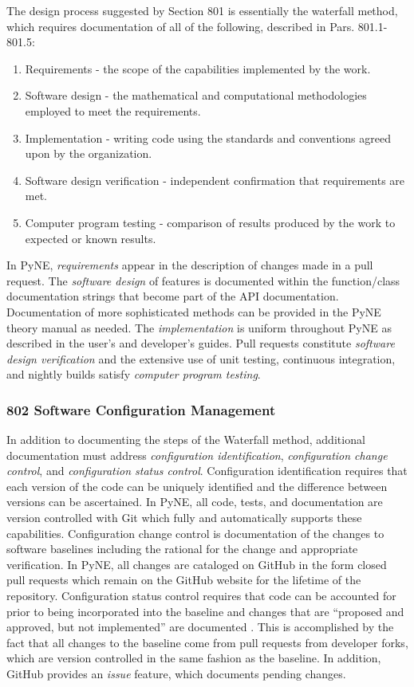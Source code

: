 \documentclass{anstrans}
\begin{document}
The design process suggested by Section 801 is essentially the waterfall method, which requires documentation of all of the following, described in Pars. 801.1-801.5:

\begin{enumerate} 
\item{Requirements - the scope of the capabilities implemented by the work.}
\item{Software design - the mathematical and computational methodologies employed to meet the requirements.}
\item{Implementation - writing code using the standards and conventions agreed upon by the organization.}
\item{Software design verification - independent confirmation that requirements are met.}
\item{Computer program testing - comparison of results produced by the work to expected or known results.}
\end{enumerate}

In PyNE, \emph{requirements} appear in the description of changes made in
a pull request. 
The \emph{software design} of features is documented
within the function/class documentation strings that become part of the API
documentation. Documentation of more sophisticated methods can be provided in the PyNE
theory manual as needed. The \emph{implementation} is uniform throughout PyNE as 
described in the user's and developer's guides. Pull requests constitute 
\emph{software design verification} and the extensive use of unit testing, 
continuous integration, and nightly builds
satisfy \emph{computer program testing}.

\subsubsection{802 Software Configuration Management}

In addition to documenting the steps of the Waterfall method, additional
documentation must address \emph{configuration identification}, \emph{configuration change
control}, and \emph{configuration status control}. Configuration identification
requires that each version of the code can be uniquely identified and the
difference between versions can be ascertained. In PyNE, all code, tests, and
documentation are version controlled with Git which fully and automatically 
supports these
capabilities. Configuration change control is documentation of the changes to
software baselines including the rational for the change and appropriate
verification. In PyNE, all changes are cataloged on GitHub in the form closed pull
requests which remain on the GitHub website for the lifetime of the repository.
Configuration status control requires that code can be accounted for prior to
being incorporated into the baseline and changes that are ``proposed and approved,
but not implemented'' are documented \cite{add}. This is accomplished by the fact that all
changes to the baseline come from pull requests from developer forks, which are
version controlled in the same fashion as the baseline. In addition, GitHub
provides an \emph{issue} feature, which documents pending changes.
\end{document}
